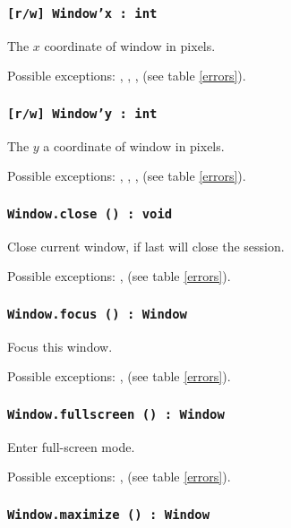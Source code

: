 \subsubsection{\texttt{[r/w] Window'x : int}}

The $x$ coordinate of window in pixels.

Possible exceptions: , , ,  (see table \ref{errors}).

\subsubsection{\texttt{[r/w] Window'y : int}}

The $y$ a coordinate of window in pixels.

Possible exceptions: , , ,  (see table \ref{errors}).

\subsubsection{\texttt{Window.close () : void}}

Close current window, if last will close the session.

Possible exceptions: ,  (see table \ref{errors}).

\subsubsection{\texttt{Window.focus () : Window}}

Focus this window.

Possible exceptions: ,  (see table \ref{errors}).

\subsubsection{\texttt{Window.fullscreen () : Window}}

Enter full-screen mode.

Possible exceptions: ,  (see table \ref{errors}).

\subsubsection{\texttt{Window.maximize () : Window}}

